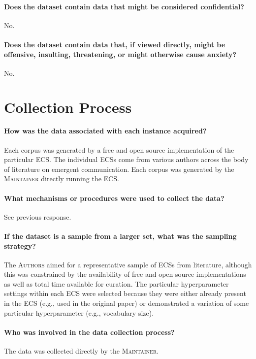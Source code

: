 \documentclass{article}
\newcommand\A{\textsc{Authors}}
\newcommand\M{\textsc{Maintainer}}
\begin{document}
\paragraph{Does the dataset contain data that might be considered confidential?}
No.

\paragraph{Does the dataset contain data that, if viewed directly, might be offensive, insulting, threatening, or might otherwise cause anxiety?}
No.

\section{Collection Process}
\paragraph{How was the data associated with each instance acquired?}
Each corpus was generated by a free and open source implementation of the particular ECS\@.
The individual ECSs come from various authors across the body of literature on emergent communication.
Each corpus was generated by the \M{} directly running the ECS\@.

\paragraph{What mechanisms or procedures were used to collect the data?}
See previous response.

\paragraph{If the dataset is a sample from a larger set, what was the sampling strategy?}
The \A{} aimed for a representative sample of ECSs from literature, although this was constrained by the availability of free and open source implementations as well as total time available for curation.
The particular hyperparameter settings within each ECS were selected because they were either already present in the ECS (e.g., used in the original paper) or demonstrated a variation of some particular hyperparameter (e.g., vocabulary size).

\paragraph{Who was involved in the data collection process?}
The data was collected directly by the \M{}.
\end{document}
